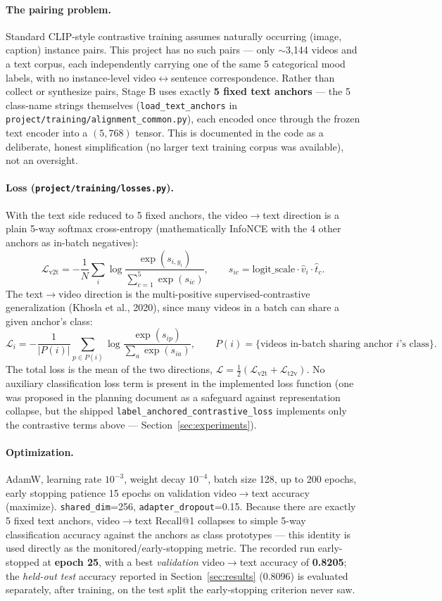 \documentclass[11pt]{article}
\begin{document}
\paragraph{The pairing problem.} Standard CLIP-style contrastive training assumes naturally
occurring (image, caption) instance pairs. This project has no such pairs --- only $\sim$3{,}144
videos and a text corpus, each independently carrying one of the same 5 categorical mood labels,
with no instance-level video$\leftrightarrow$sentence correspondence. Rather than collect or
synthesize pairs, Stage B uses exactly \textbf{5 fixed text anchors} --- the 5 class-name strings
themselves (\texttt{load\_text\_anchors} in \texttt{project/training/alignment\_common.py}), each
encoded once through the frozen text encoder into a $(5,768)$ tensor. This is documented in the
code as a deliberate, honest simplification (no larger text training corpus was available), not an
oversight.

\paragraph{Loss (\texttt{project/training/losses.py}).} With the text side reduced to 5 fixed
anchors, the video$\to$text direction is a plain 5-way softmax cross-entropy (mathematically
InfoNCE with the 4 other anchors as in-batch negatives):
\[
\mathcal{L}_{\text{v2t}} = -\frac{1}{N}\sum_i \log\frac{\exp(s_{i,y_i})}{\sum_{c=1}^{5}\exp(s_{ic})},
\qquad s_{ic} = \text{logit\_scale}\cdot \hat v_i\cdot \hat t_c.
\]
The text$\to$video direction is the multi-positive supervised-contrastive generalization (Khosla et
al., 2020), since many videos in a batch can share a given anchor's class:
\[
\mathcal{L}_i = -\frac{1}{|P(i)|}\sum_{p\in P(i)}\log\frac{\exp(s_{ip})}{\sum_a \exp(s_{ia})},
\qquad P(i) = \{\text{videos in-batch sharing anchor } i\text{'s class}\}.
\]
The total loss is the mean of the two directions, $\mathcal{L}=\tfrac12(\mathcal{L}_{\text{v2t}}+\mathcal{L}_{\text{t2v}})$.
No auxiliary classification loss term is present in the implemented loss function (one was
proposed in the planning document as a safeguard against representation collapse, but the shipped
\texttt{label\_anchored\_contrastive\_loss} implements only the contrastive terms above ---
Section~\ref{sec:experiments}).

\paragraph{Optimization.} AdamW, learning rate $10^{-3}$, weight decay $10^{-4}$, batch size 128,
up to 200 epochs, early stopping patience 15 epochs on validation video$\to$text accuracy
(maximize). \texttt{shared\_dim}=256, \texttt{adapter\_dropout}=0.15. Because there are exactly 5
fixed text anchors, video$\to$text Recall@1 collapses to simple 5-way classification accuracy
against the anchors as class prototypes --- this identity is used directly as the monitored/early-stopping metric. The recorded run early-stopped at \textbf{epoch 25}, with a best
\emph{validation} video$\to$text accuracy of \textbf{0.8205}; the \emph{held-out test} accuracy
reported in Section~\ref{sec:results} (0.8096) is evaluated separately, after training, on the test
split the early-stopping criterion never saw.
\end{document}
